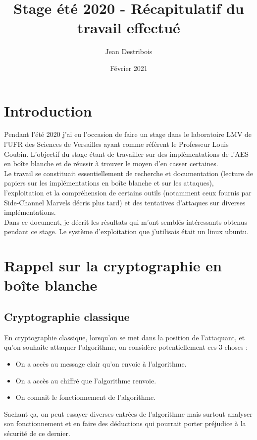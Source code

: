 \documentclass[10pt,a4paper]{article}
\author{Jean Destribois}
\title{Stage été 2020 - Récapitulatif du travail effectué}
\date{Février 2021}
\begin{document}
\maketitle

\tableofcontents

\newpage

\section{Introduction}
Pendant l'été 2020 j'ai eu l'occasion de faire un stage dans le laboratoire LMV de l'UFR des Sciences de Versailles ayant comme référent le Professeur Louis Goubin. L'objectif du stage étant de travailler sur des implémentations de l'AES en boîte blanche et de réussir à trouver le moyen d'en casser certaines.
\\
Le travail se constituait essentiellement de recherche et documentation (lecture de papiers sur les implémentations en boîte blanche et sur les attaques), l'exploitation et la compréhension de certains outils (notamment ceux fournis par Side-Channel Marvels décris plus tard) et des tentatives d'attaques sur diverses implémentations.
\\
Dans ce document, je décrit les résultats qui m'ont semblés intéressants obtenus pendant ce stage. Le système d'exploitation que j'utilisais était un linux ubuntu. 

\section{Rappel sur la cryptographie en boîte blanche}
\subsection{Cryptographie classique}
En cryptographie classique, lorsqu'on se met dans la position de l'attaquant, et qu'on souhaite attaquer l'algorithme, on considère potentiellement ces 3 choses :
\begin{itemize}
\item On a accès au message clair qu'on envoie à l'algorithme.
\item On a accès au chiffré que l'algorithme renvoie.
\item On connait le fonctionnement de l'algorithme.
\end{itemize}
Sachant ça, on peut essayer diverses entrées de l'algorithme mais surtout analyser son fonctionnement et en faire des déductions qui pourrait porter préjudice à la sécurité de ce dernier.
\end{document}
